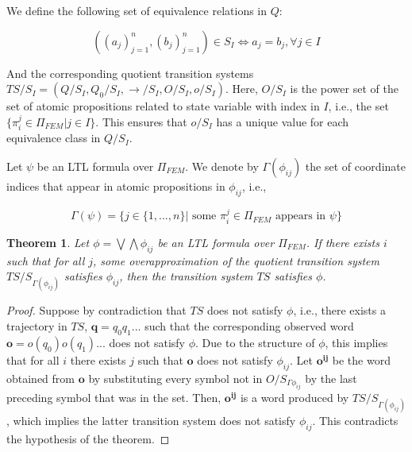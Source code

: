 \documentclass{article}
\newtheorem{theorem}{Theorem}
\begin{document}
We define the following set of equivalence relations in $Q$:

\begin{equation}
    ((a_j)_{j=1}^n,(b_j)_{j=1}^n) \in S_I \iff a_j = b_j, \forall j \in I
\end{equation}

And the corresponding quotient transition systems $TS/S_I = (Q/S_I, Q_0/S_I,
\to/S_I, O/S_I, o/S_I)$. Here, $O/S_I$ is the power set of the set of atomic
propositions related to state variable with index in $I$, i.e., the set
$\{\pi_i^j \in \Pi_{FEM} | j \in I \}$. This ensures that $o/S_I$ has a unique
value for each equivalence class in $Q/S_I$.

Let $\psi$ be an LTL formula over $\Pi_{FEM}$. We
denote by $\Gamma(\phi_{ij})$ the set of coordinate indices that appear in
atomic propositions in $\phi_{ij}$, i.e.,

\begin{equation}
    \Gamma(\psi) = \{j \in \{1,...,n\}| \text{ some }\pi_i^j \in \Pi_{FEM} \text{ appears in } \psi\}
\end{equation}


\begin{theorem}

Let $\phi = \bigvee \bigwedge \phi_{ij}$ be an LTL formula over $\Pi_{FEM}$. If
there exists $i$ such that for all $j$, some overapproximation of the quotient transition system
$TS/S_{\Gamma(\phi_{ij})}$ satisfies $\phi_{ij}$, then the transition system $TS$
satisfies $\phi$.
    
\end{theorem}

\begin{proof}

Suppose by contradiction that $TS$ does not satisfy $\phi$, i.e., there exists a
trajectory in $TS$, $\mathbf{q} = q_0 q_1...$ such that the corresponding observed
word $\mathbf{o} = o(q_0) o(q_1)...$ does not satisfy $\phi$. Due to the structure
of $\phi$, this implies that for all $i$ there exists $j$ such that $\mathbf{o}$ does
not satisfy $\phi_{ij}$. Let $\mathbf{o^{ij}}$ be the word obtained from
$\mathbf{o}$ by substituting every symbol not in $O/S_{\Gamma{\phi_{ij}}}$ by
the last preceding symbol that was in the set. Then, $\mathbf{o^{ij}}$ is a word
produced by $TS/S_{\Gamma(\phi_{ij})}$, which implies the latter transition system
does not satisfy $\phi_{ij}$. This contradicts the hypothesis of the
theorem.
    
\end{proof}
\end{document}

